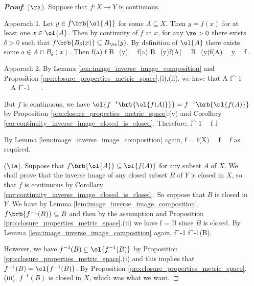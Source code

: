 \begin{proof}[\bf Proof]
($\ra$). Suppose that $f:X\to Y$ is continuous.

Apporach 1. Let $y\in f\brb{\ol{A}}$ for some $A\subseteq X$. Then $y = f(x)$ for at least one $x\in \ol{A}$. Then by continuity of $f$ at $x$, for any $\ve>0$ there exists $\delta>0$ such that $f\brb{B_\delta(x)}\subseteq B_\ve(y)$. By definition of $\ol{A}$ there exists some $a\in A\cap B_\delta(x)$. Then
\be
f(a) \in f \subseteq B_\ve(y) \ \ra\ f(a) \in B_\ve(y)\cap f(A) \ \ra\ B_\ve(y)\cap f(A) \neq \emptyset \ \ra\ y \in{} \ \ra\  f \subseteq {}.
\ee

Apporach 2. By Lemma \ref{lem:image_inverse_image_composition} and Proposition \ref{pro:closure_properties_metric_space}.(i),(ii), we have that
\be
A \subseteq f^{-1} \ \ra\ A \subseteq f^{-1} \ \ra\  \subseteq {}.
\ee

But $f$ is continuous, we have $\ol{f^{-1}\brb{\ol{f(A)}}} = f^{-1}\brb{\ol{f(A)}}$ by Proposition \ref{pro:closure_properties_metric_space}.(v) and Corollary \ref{cor:continuity_inverse_image_closed_is_closed}. Therefore,
\be
{} \subseteq f^{-1} \ \ra\ f \subseteq f
\ee

By Lemma \ref{lem:image_inverse_image_composition} again,
\be
 f = \cap f(X) \ \ra\  f \subseteq {} \ \ra\ f \subseteq {}
\ee
as required. %

($\la$). Suppose that $f\brb{\ol{A}} \subseteq \ol{f(A)}$ for any subset $A$ of $X$. We shall prove that the inverse image of any closed subset $B$ of $Y$ is closed in $X$, so that $f$ is continuous by Corollary \ref{cor:continuity_inverse_image_closed_is_closed}. So suppose that $B$ is closed in $Y$. We have by Lemma \ref{lem:image_inverse_image_composition}, $f\brb{f^{-1}(B)} \subseteq B$ and then by the assumption and Proposition \ref{pro:closure_properties_metric_space}.(ii) we have
\be
f \subseteq {} \subseteq {} = B
\ee
since $B$ is closed. By Lemma \ref{lem:image_inverse_image_composition} again,
\be
{} \subseteq f^{-1} \subseteq f^{-1}(B).
\ee

However, we have $f^{-1}(B)\subseteq \ol{f^{-1}(B)}$ by Proposition \ref{pro:closure_properties_metric_space}.(i) and this implies that $f^{-1}(B)= \ol{f^{-1}(B)}$. By Proposition \ref{pro:closure_properties_metric_space}.(iii), $f^{-1}(B)$ is closed in $X$, which was what we want.
\end{proof}



